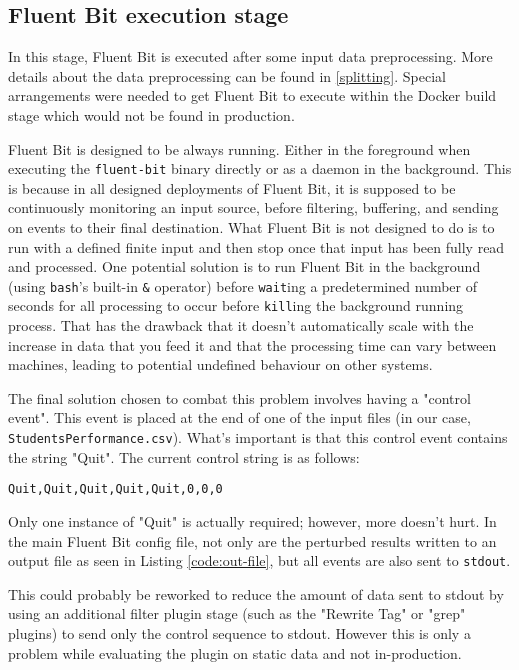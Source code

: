\subsection{Fluent Bit execution stage}
In this stage, Fluent Bit is executed after some input data preprocessing. More details about the data preprocessing can be found in \ref{splitting}. Special arrangements were needed to get Fluent Bit to execute within the Docker build stage which would not be found in production.

Fluent Bit is designed to be always running. Either in the foreground when executing the \texttt{fluent-bit} binary directly or as a \Gls{daemon} in the background. This is because in all designed deployments of Fluent Bit, it is supposed to be continuously monitoring an input source, before filtering, buffering, and sending on \glspl{event} to their final destination. What Fluent Bit is not designed to do is to run with a defined finite input and then stop once that input has been fully read and processed. One potential solution is to run Fluent Bit in the background (using \texttt{bash}'s built-in \texttt{\&} operator) before \texttt{wait}ing a predetermined number of seconds for all processing to occur before \texttt{kill}ing the background running process. That has the drawback that it doesn't automatically scale with the increase in data that you feed it and that the processing time can vary between machines, leading to potential undefined behaviour on other systems. 

The final solution chosen to combat this problem involves having a "control event". This event is placed at the end of one of the input files (in our case, \texttt{StudentsPerformance.csv}). What's important is that this control event contains the string "Quit". The current control string is as follows:

\begin{lstlisting}[caption={Quit Control code line}]
Quit,Quit,Quit,Quit,Quit,0,0,0
\end{lstlisting}

Only one instance of "Quit" is actually required; however, more doesn't hurt. In the main Fluent Bit config file, not only are the perturbed results written to an output file as seen in Listing \ref{code:out-file}, but all events are also sent to \texttt{stdout}.

This could probably be reworked to reduce the amount of data sent to stdout by using an additional filter plugin stage (such as the "Rewrite Tag" or "grep" plugins) to send only the control sequence to stdout. However this is only a problem while evaluating the plugin on static data and not in-production.

